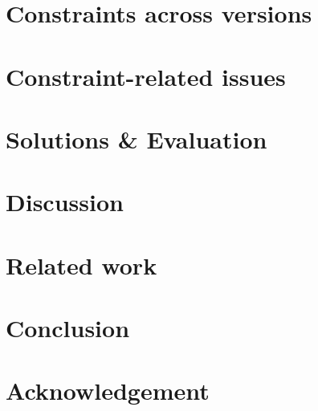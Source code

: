 \documentclass[sigconf]{acmart}
\begin{document}
\section{Constraints   across versions}
\label{sec:evolve}


\section{Constraint-related issues}
\label{sec:causes}


 \section{Solutions \& Evaluation}
\label{sec:solution}
 
 

\section{Discussion}
\label{sec:threats}


\section{Related work
}



\section{Conclusion}




\section*{Acknowledgement}

%

\newpage




 
\end{document}
